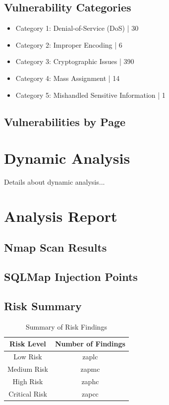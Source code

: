 \documentclass[12pt]{article}
\begin{document}
\subsection{Vulnerability Categories}
\begin{itemize}
\item Category 1: Denial-of-Service (DoS) | 30
\item Category 2: Improper Encoding | 6
\item Category 3: Cryptographic Issues | 390
\item Category 4: Mass Assignment | 14
\item Category 5: Mishandled Sensitive Information | 1

\end{itemize}

\subsection{Vulnerabilities by Page}

\newpage
\section{Dynamic Analysis}
Details about dynamic analysis...

\section{Analysis Report}

\subsection{Nmap Scan Results}

\subsection{SQLMap Injection Points}

\subsection{Risk Summary}
\begin{table}[h!]
\centering
\renewcommand{\arraystretch}{1.5}
\begin{tabular}{|c|c|}
\hline
\textbf{Risk Level} & \textbf{Number of Findings} \\
\hline
Low Risk & zaplc \\ 
\hline
Medium Risk & zapmc \\ 
\hline
High Risk & zaphc \\ 
\hline
Critical Risk & zapcc \\ 
\hline
\end{tabular}
\caption{Summary of Risk Findings}
\label{tab:risk_summary}
\end{table}
\end{document}
